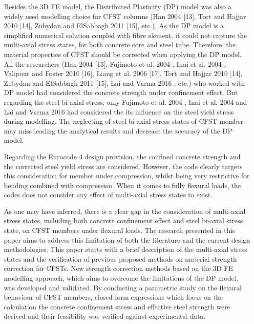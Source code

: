 \documentclass[12pt, A4]{article}
\begin{document}
	\par
	Besides the 3D FE model, the Distributed Plasticity (DP) model was also a widely used modelling choice for CFST columns (Han 2004 [13], Tort and Hajjar 2010 [14], Zubydan and ElSabbagh 2011 [15], etc.). As the DP model is a simplified numerical solution coupled with fibre element, it could not capture the multi-axial stress states, for both concrete core and steel tube. Therefore, the material properties of CFST should be corrected when applying the DP model. All the researchers (Han 2004 [13], Fujimoto et al. 2004 \cite{RN15}, Inai et al. 2004 \cite{RN30}, Valipour and Foster 2010 [16], Liang et al. 2006 [17], Tort and Hajjar 2010 [14], Zubydan and ElSabbagh 2011 [15], Lai and Varma 2016 \cite{RN32}, etc.) who worked with DP model had considered the concrete strength under confinement effect. But regarding the steel bi-axial stress, only Fujimoto et al. 2004 \cite{RN15}, Inai et al. 2004 \cite{RN30} and Lai and Varma 2016 \cite{RN32} had considered the its influence on the steel yield stress during modelling. The neglecting of steel bi-axial stress states of CFST member may miss leading the analytical results and decrease the accuracy of the DP model.
	\par
	Regarding the Eurocode 4 \cite{RN64} design provision, the confined concrete strength and the corrected steel yield stress are considered. However, the code clearly targets this consideration for member under compression, whilst being very restrictive for bending combined with compression. When it comes to fully flexural loads, the codes does not consider any effect of multi-axial stress states to exist.
	\par
	As one may have inferred, there is a clear gap in the consideration of multi-axial stress states, including both concrete confinement effect and steel bi-axial stress state, on CFST members under flexural loads. The research presented in this paper aims to address this limitation of both the literature and the current design methodologies. This paper starts with a brief description of the multi-axial stress states and the verification of previous proposed methods on material strength correction for CFSTs. New strength correction methods based on the 3D FE modelling approach, which aims to overcome the limitations of the DP model, was developed and validated. By conducting a parametric study on the flexural behaviour of CFST members, closed-form expressions which focus on the calculation the concrete confinement stress and effective steel strength were derived and their feasibility was verified against experimental data. 
	
	
	
	
	
\end{document}
